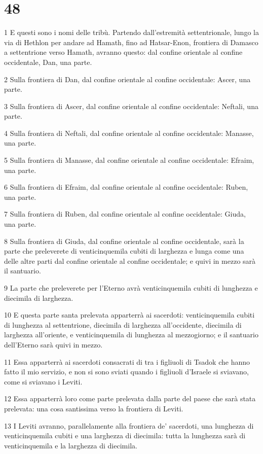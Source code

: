 \chapter{48}

\par 1 E questi sono i nomi delle tribù. Partendo dall'estremità settentrionale, lungo la via di Hethlon per andare ad Hamath, fino ad Hatsar-Enon, frontiera di Damasco a settentrione verso Hamath, avranno questo: dal confine orientale al confine occidentale, Dan, una parte.
\par 2 Sulla frontiera di Dan, dal confine orientale al confine occidentale: Ascer, una parte.
\par 3 Sulla frontiera di Ascer, dal confine orientale al confine occidentale: Neftali, una parte.
\par 4 Sulla frontiera di Neftali, dal confine orientale al confine occidentale: Manasse, una parte.
\par 5 Sulla frontiera di Manasse, dal confine orientale al confine occidentale: Efraim, una parte.
\par 6 Sulla frontiera di Efraim, dal confine orientale al confine occidentale: Ruben, una parte.
\par 7 Sulla frontiera di Ruben, dal confine orientale al confine occidentale: Giuda, una parte.
\par 8 Sulla frontiera di Giuda, dal confine orientale al confine occidentale, sarà la parte che preleverete di venticinquemila cubiti di larghezza e lunga come una delle altre parti dal confine orientale al confine occidentale; e quivi in mezzo sarà il santuario.
\par 9 La parte che preleverete per l'Eterno avrà venticinquemila cubiti di lunghezza e diecimila di larghezza.
\par 10 E questa parte santa prelevata apparterrà ai sacerdoti: venticinquemila cubiti di lunghezza al settentrione, diecimila di larghezza all'occidente, diecimila di larghezza all'oriente, e venticinquemila di lunghezza al mezzogiorno; e il santuario dell'Eterno sarà quivi in mezzo.
\par 11 Essa apparterrà ai sacerdoti consacrati di tra i figliuoli di Tsadok che hanno fatto il mio servizio, e non si sono sviati quando i figliuoli d'Israele si sviavano, come si sviavano i Leviti.
\par 12 Essa apparterrà loro come parte prelevata dalla parte del paese che sarà stata prelevata: una cosa santissima verso la frontiera di Leviti.
\par 13 I Leviti avranno, parallelamente alla frontiera de' sacerdoti, una lunghezza di venticinquemila cubiti e una larghezza di diecimila: tutta la lunghezza sarà di venticinquemila e la larghezza di diecimila.
